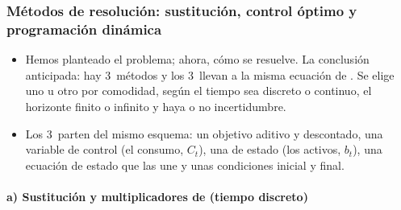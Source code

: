 \documentclass[11pt]{article}
\begin{document}
\subsubsection{Métodos de resolución:\cortetitulo{} sustitución, control óptimo y programación dinámica}\label{sec:metodos}

\begin{itemize}
\item Hemos planteado el problema; ahora, cómo se resuelve. La conclusión anticipada: hay 3~métodos y los 3~llevan a la misma ecuación de . Se elige uno u otro por comodidad, según el tiempo sea discreto o continuo, el horizonte finito o infinito y haya o no incertidumbre.
\item Los 3~parten del mismo esquema: un objetivo aditivo y descontado, una variable de control (el consumo, $C_t$), una de estado (los activos, $b_t$), una ecuación de estado que las une y unas condiciones inicial y final.
\end{itemize}

\paragraph{a) Sustitución y multiplicadores de  (tiempo discreto)}
\end{document}
